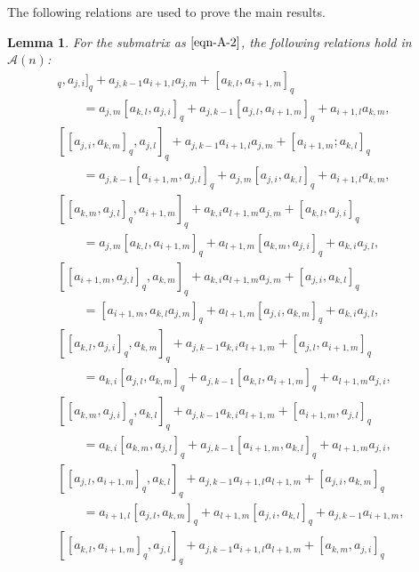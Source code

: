 \documentclass[pdftex]{sigma}
\numberwithin{equation}{section}
\def\lr#1{\left[#1\right]}
\def\lq#1{\left[#1\right]_q}
\def\A{\mathscr{A}}
\newtheorem{Lemma}[Theorem]{Lemma}
\begin{document}
The following relations are used to prove the main results.
\begin{Lemma}\label{lem:eqn-1}
For the submatrix \smash{$\A_{j,k,i+1}^{i,l,m}$} as $\eqref{eqn-A-2}$, the following relations hold in $\A(n)$:
\begin{gather}%
 [\lr{a_{j,l}, a_{k,m}}_q, a_{j,i}]_q +a_{j,k-1}a_{i+1,l}a_{j,m} +\lr{a_{k,l}, a_{i+1,m}}_q \nonumber \\
 \qquad= a_{j,m}\lr{a_{k,l}, a_{j,i}}_q+a_{j,k-1}\lr{a_{j,l}, a_{i+1,m}}_q+a_{i+1,l}a_{k,m}, \tag{1.a} \label{eqn:1a}\\
 [\lr{a_{j,i}, a_{k,m}}_q, a_{j,l}]_q+a_{j,k-1}a_{i+1,l}a_{j,m}+\lr{a_{i+1,m}; a_{k,l}}_q \nonumber \\
 \qquad = a_{j,k-1}\lr{a_{i+1,m}, a_{j,l}}_q +a_{j,m}\lr{a_{j,i}, a_{k,l}}_q+a_{i+1,l}a_{k,m},\tag{1.b} \label{eqn:1b} \\
 [\lr{a_{k,m}, a_{j,l}}_q, a_{i+1,m}]_q+a_{k,i}a_{l+1,m}a_{j,m} +\lr{a_{k,l}, a_{j,i}}_q \nonumber \\
 \qquad = a_{j,m}\lr{a_{k,l}, a_{i+1,m}}_q+a_{l+1,m}\lr{a_{k,m}, a_{j,i}}_q +a_{k,i}a_{j,l}, \tag{2.a} \label{eqn:2a}\\
 [\lq{a_{i+1,m},a_{j,l}}, a_{k,m}]_q+a_{k,i}a_{l+1,m}a_{j,m} +\lr{a_{j,i}, a_{k,l}}_q\nonumber \\
 \qquad = \lr{a_{i+1,m}, a_{k,l}a_{j,m}}_q +a_{l+1,m}\lr{a_{j,i}, a_{k,m}}_q+a_{k,i}a_{j,l}, \tag{2.b} \label{eqn:2b}\\
 [\lr{a_{k,l}, a_{j,i}}_q, a_{k,m}]_q +a_{j,k-1}a_{k,i}a_{l+1,m}+\lr{a_{j,l}, a_{i+1,m}}_q \nonumber \\
 \qquad= a_{k,i}\lr{a_{j,l}, a_{k,m}}_q+a_{j,k-1}\lr{a_{k,l}, a_{i+1,m}}_q+a_{l+1,m}a_{j,i}, \tag{3.a} \label{eqn:3a}\\
 [\lr{a_{k,m}, a_{j,i}}_q, a_{k,l}]_q+a_{j,k-1}a_{k,i}a_{l+1,m}+\lr{a_{i+1,m}, a_{j,l}}_q \nonumber \\
 \qquad= a_{k,i}\lr{a_{k,m}, a_{j,l}}_q+a_{j,k-1}\lr{a_{i+1,m}, a_{k,l}}_q+a_{l+1,m}a_{j,i}, \tag{3.b} \label{eqn:3b}\\
 [\lq{a_{j,l},a_{i+1,m}}, a_{k,l}]_q+a_{j,k-1}a_{i+1,l}a_{l+1,m} +\lr{a_{j,i}, a_{k,m}}_q \nonumber \\
 \qquad= a_{i+1,l}\lr{a_{j,l}, a_{k,m}}_q +a_{l+1,m}\lr{a_{j,i}, a_{k,l}}_q +a_{j,k-1}a_{i+1,m},\tag{4.a} \\
 [\lq{a_{k,l},a_{i+1,m}}, a_{j,l}]_q +a_{j,k-1}a_{i+1,l}a_{l+1,m} +\lr{a_{k,m}, a_{j,i}}_q \nonumber \\

\end{gather}
\end{Lemma}
\end{document}
